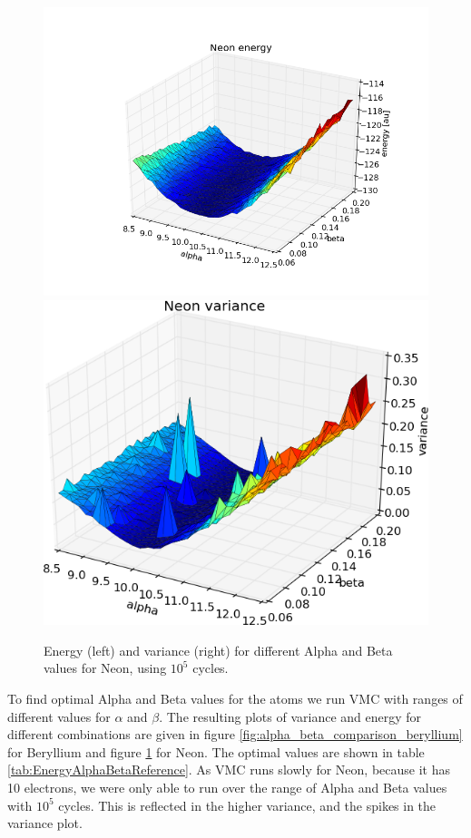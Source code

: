 		\begin{figure}
			\centering \includegraphics[width=0.45\linewidth]{../figures/Neon_alpha_beta_energy}
			\centering \includegraphics[width=0.45\linewidth]{../figures/Neon_alpha_beta_variance}
			\protect\caption{Energy (left) and variance (right) for different Alpha and Beta values for Neon, using $10^{5}$ cycles.}
			\label{fig:alpha_beta_comparison_neon}
		\end{figure}

		To find optimal Alpha and Beta values for the atoms we run VMC with ranges of different values for \(\alpha\) and \(\beta\). The resulting plots of variance and energy for different combinations are given in figure \ref{fig:alpha_beta_comparison_beryllium} for Beryllium and figure \ref{fig:alpha_beta_comparison_neon} for Neon. The optimal values are shown in table \ref{tab:EnergyAlphaBetaReference}. As VMC runs slowly for Neon, because it has 10 electrons, we were only able to run over the range of Alpha and Beta values with $10^{5}$ cycles. This is reflected in the higher variance, and the spikes in the variance plot.

